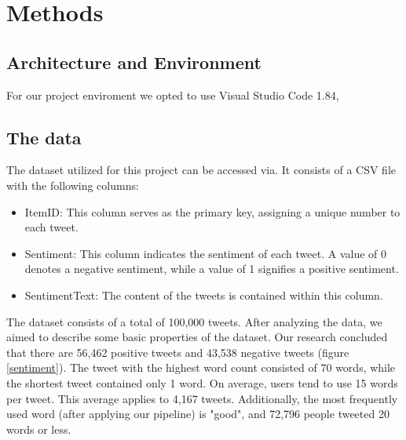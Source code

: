 \documentclass[11pt,a4paper]{article}
\begin{document}
\section{Methods}
\subsection{Architecture and Environment}
For our project enviroment we opted to use Visual Studio Code 1.84, 
\subsection{The data}
The dataset utilized for this project can be accessed via. 
It consists of a CSV file with the following columns:
\begin{itemize}
\item ItemID: This column serves as the primary key, assigning a unique number to each tweet.
\item Sentiment: This column indicates the sentiment of each tweet. A value of 0 denotes a negative sentiment, while a value of 1 signifies a positive sentiment.
\item SentimentText: The content of the tweets is contained within this column.
\end{itemize}
The dataset consists of a total of 100,000 tweets. After analyzing the data, we aimed to describe some basic properties of the dataset. Our research concluded that there are 56,462 positive tweets and 43,538 negative tweets (figure \ref{sentiment}). The tweet with the highest word count consisted of 70 words, while the shortest tweet contained only 1 word. On average, users tend to use 15 words per tweet. This average applies to 4,167 tweets. Additionally, the most frequently used word (after applying our pipeline) is "good", and 72,796 people tweeted 20 words or less.
\end{document}
